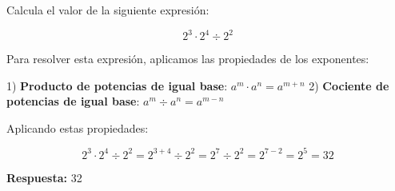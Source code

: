 %

\begin{ejercicio}[
  id=ALG_EXP_0001,  %
  materia=algebra,
  capitulo=exponentes,
  nivel=basico,
  procedencia="Examen UNI 2023",
  visibilidad=true,
  libros={algebra_pre, algebra_basica}
]

Calcula el valor de la siguiente expresión:

$$2^3 \cdot 2^4 \div 2^2$$

\begin{solucion}

Para resolver esta expresión, aplicamos las propiedades de los exponentes:

1) \textbf{Producto de potencias de igual base}: $a^m \cdot a^n = a^{m+n}$
2) \textbf{Cociente de potencias de igual base}: $a^m \div a^n = a^{m-n}$

Aplicando estas propiedades:

$$2^3 \cdot 2^4 \div 2^2 = 2^{3+4} \div 2^2 = 2^7 \div 2^2 = 2^{7-2} = 2^5 = 32$$

\textbf{Respuesta:} 32
\end{solucion}
\end{ejercicio} 